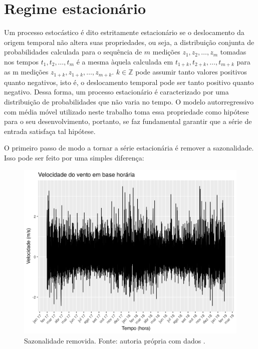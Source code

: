 \documentclass[
	12pt,				%
	openright,			%
	oneside,			%
	a4paper,			%
	english,			%
	french,				%
	spanish,			%
	brazil				%
	]{abntex2}
\begin{document}
\section{Regime estacionário}

Um processo estocástico é dito estritamente estacionário se o deslocamento da origem temporal não altera suas propriedades, ou seja, a distribuição conjunta de probabilidades calculada para o sequência de $m$ medições $z_1,z_2,\dots,z_m$ tomadas nos tempos $t_1, t_2, \dots, t_m$ é a mesma àquela calculada em $t_{1+k}, t_{2+k}, \dots, t_{m+k}$ para as m medições $z_{1+k},z_{1+k},\dots,z_{m+k}$. $k\in\mathbb{Z}$ pode assumir tanto valores positivos quanto negativos, isto é, o deslocamento temporal pode ser tanto positivo quanto negativo. Dessa forma, 
um processo estacionário é caracterizado por uma distribuição de probabilidades que não varia no tempo. O modelo autorregressivo com média móvel utilizado neste trabalho toma essa propriedade como hipótese para o seu desenvolvimento, portanto, se faz fundamental garantir que a série de entrada satisfaça tal hipótese.

O primeiro passo de modo a tornar a série estacionária é remover a sazonalidade. Isso pode ser feito por uma simples diferença:

\begin{figure}[h]
    \centering
	\includegraphics[width=\textwidth]{entire_series_hourly_basis_seasonless.png}
	\caption{Sazonalidade removida. Fonte: autoria própria com dados \cite{era5}.}
\end{figure}
\FloatBarrier
\end{document}
